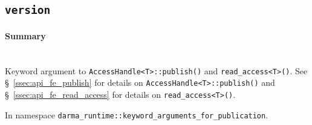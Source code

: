 \subsection{\texttt{version}}
\label{ssec:api_fe_version}

\paragraph{Summary}\mbox{}\\ 
Keyword argument to \texttt{AccessHandle<T>::publish()} and
\texttt{read\_access<T>()}.  See \S~\ref{ssec:api_fe_publish} for details on
\texttt{AccessHandle<T>::publish()} and \S~\ref{ssec:api_fe_read_access} for
details on \texttt{read\_access<T>()}.

In namespace \texttt{darma\_runtime::keyword\_arguments\_for\_publication}.

%
%
%
%




